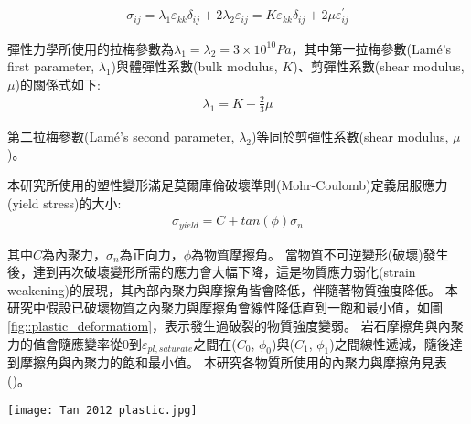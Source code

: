 \begin{align}
    \sigma_{ij}=\lambda_1 \varepsilon_{kk} \delta_{ij}+2 \lambda_2 \varepsilon_{ij}=K\varepsilon_{kk} \delta_{ij}+2 \mu \varepsilon_{ij}^{'} \label{eqn:elastic tensor}
\end{align}

彈性力學所使用的拉梅參數為$\lambda_1 = \lambda_2 = 3 \times 10^{10} Pa$，其中第一拉梅參數(Lamé's first parameter, $\lambda_1$)與體彈性系數(bulk modulus, $K$)、剪彈性系數(shear modulus, $\mu$)的關係式如下:
\begin{align}
\lambda_1 = K - \frac{2}{3}\mu
\end{align}

第二拉梅參數(Lamé's second parameter, $\lambda_2$)等同於剪彈性系數(shear modulus, $\mu$)。

本研究所使用的塑性變形滿足莫爾庫倫破壞準則(Mohr-Coulomb)定義屈服應力(yield stress)的大小:
\begin{align}
    \sigma_{yield}=C+tan(\phi)\sigma_{n}\label{eqn:plastic deformation}
\end{align}

其中$C$為內聚力，$\sigma_n$為正向力，$\phi$為物質摩擦角。
當物質不可逆變形(破壞)發生後，達到再次破壞變形所需的應力會大幅下降，這是物質應力弱化(strain weakening)的展現，其內部內聚力與摩擦角皆會降低，伴隨著物質強度降低。
本研究中假設已破壞物質之內聚力與摩擦角會線性降低直到一飽和最小值，如圖\ref{fig::plastic_deformatiom}，表示發生過破裂的物質強度變弱。
岩石摩擦角與內聚力的值會隨應變率從0到$\varepsilon_{pl,saturate}$之間在($C_0$, $\phi_0$)與($C_1$, $\phi_1$)之間線性遞減，隨後達到摩擦角與內聚力的飽和最小值。
本研究各物質所使用的內聚力與摩擦角見表()。
\begin{figure*}[ht!]
    \centering
    \texttt{[image: Tan 2012 plastic.jpg]}
    \caption[應力弱化示意圖，摘自\citealp{Tan2012}。]{應力弱化示意圖，摘自\citealp{Tan2012}。在應變率為$0$時，岩石摩擦角與內聚力分別為$C_0$, $\phi_0$ ; 在應變率大於$\varepsilon_{pl,saturate}$時，岩石摩擦角與內聚力分別為$C_1$, $\phi_1$。摩擦角與內聚力的值會隨應變率變化在($C_0$, $\phi_0$)與($C_1$, $\phi_1$)之間線性遞減。
    }
    \label{fig::plastic_deformatiom}
\end{figure*}

